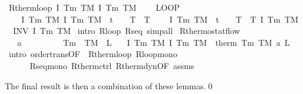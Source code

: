 \documentclass[envcountsame,envcountsect]{llncs}
\begin{document}
\begin{example}
\begin{isabellebody}
\isanewline
{}\isamarkupfalse%
\ R{\isacharunderscore}therm{\isacharunderscore}loop{\isacharcolon}\ {\isachardoublequoteopen}\isactrlbold {\isacharbrackleft}I\ T\isactrlsub m\ T\isactrlsub M{\isacharcomma}\ I\ T\isactrlsub m\ T\isactrlsub M\isactrlbold {\isacharbrackright}\ {\isasymge}\ \isanewline
\ \ {\isacharparenleft}LOOP\ \isanewline
\ \ \ \ \isactrlbold {\isacharbrackleft}I\ T\isactrlsub m\ T\isactrlsub M{\isacharcomma}\ I\ T\isactrlsub m\ T\isactrlsub M\ {\isasymand}\ t\ {\isacharequal}\ {}\ {\isasymand}\ T\ {\isacharequal}\ T\isactrlbold {\isacharbrackright}{\isacharsemicolon}\isanewline
\ \ \ \ \isactrlbold {\isacharbrackleft}I\ T\isactrlsub m\ T\isactrlsub M\ {\isasymand}\ t\ {\isacharequal}\ {}\ {\isasymand}\ T\ {\isacharequal}\ T{\isacharcomma}\ I\ T\isactrlsub m\ T\isactrlsub M\isactrlbold {\isacharbrackright}\isanewline
\ \ INV\ I\ T\isactrlsub m\ T\isactrlsub M{\isacharparenright}{\isachardoublequoteclose}\isanewline
{}\isamarkupfalse%
\ {\isacharparenleft}intro\ R{\isacharunderscore}loop\ R{\isacharunderscore}seq{\isacharcomma}\ simp{\isacharunderscore}all{\isacharparenright}\isanewline
\isanewline
{}\isamarkupfalse%
\ R{\isacharunderscore}thermostat{\isacharunderscore}flow{\isacharcolon}\ \isanewline
\ \ \ {\isachardoublequoteopen}a\ {\isachargreater}\ {}{\isachardoublequoteclose}\ \ {\isachardoublequoteopen}{}\ {\isasymle}\ {\isasymtau}{\isachardoublequoteclose}\ \ {\isachardoublequoteopen}{}\ {\isacharless}\ T\isactrlsub m{\isachardoublequoteclose}\ \ {\isachardoublequoteopen}T\isactrlsub M\ {\isacharless}\ L{\isachardoublequoteclose}\isanewline
\ \ \ {\isachardoublequoteopen}\isactrlbold {\isacharbrackleft}I\ T\isactrlsub m\ T\isactrlsub M{\isacharcomma}\ I\ T\isactrlsub m\ T\isactrlsub M\isactrlbold {\isacharbrackright}\ {\isasymge}\ therm\ T\isactrlsub m\ T\isactrlsub M\ a\ L\ {\isasymtau}{\isachardoublequoteclose}\isanewline
{}\isamarkupfalse%
\ {\isacharparenleft}intro\ order{\isacharunderscore}trans{\isacharbrackleft}OF\ {\isacharunderscore}\ R{\isacharunderscore}therm{\isacharunderscore}loop{\isacharbrackright}\ R{\isacharunderscore}loop{\isacharunderscore}mono\ \isanewline
\ \ \ \ \ \ R{\isacharunderscore}seq{\isacharunderscore}mono\ R{\isacharunderscore}therm{\isacharunderscore}ctrl\ R{\isacharunderscore}therm{\isacharunderscore}dyn{\isacharbrackleft}OF\ assms{\isacharbrackright}{\isacharparenright}\isanewline
\end{isabellebody}
The final
result is
then a combination of these lemmas.\qed
\end{example}
\end{document}
